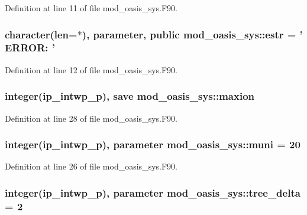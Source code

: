 Definition at line 11 of file mod\+\_\+oasis\+\_\+sys.\+F90.

\hypertarget{classmod__oasis__sys_a0f6e0376585c6f39d653f5ab05e80e8f}{
\subsubsection[{estr}]{\setlength{\rightskip}{0pt plus 5cm}character(len=$\ast$), parameter, public mod\+\_\+oasis\+\_\+sys\+::estr = ' E\+R\+R\+O\+R\+: '}}\label{classmod__oasis__sys_a0f6e0376585c6f39d653f5ab05e80e8f}


Definition at line 12 of file mod\+\_\+oasis\+\_\+sys.\+F90.

\hypertarget{classmod__oasis__sys_a9dc0e2d10d9e8e8c23e391467ae2eee4}{
\subsubsection[{maxion}]{\setlength{\rightskip}{0pt plus 5cm}integer(ip\+\_\+intwp\+\_\+p), save mod\+\_\+oasis\+\_\+sys\+::maxion\hspace{0.3cm}{\ttfamily [private]}}}\label{classmod__oasis__sys_a9dc0e2d10d9e8e8c23e391467ae2eee4}


Definition at line 28 of file mod\+\_\+oasis\+\_\+sys.\+F90.

\hypertarget{classmod__oasis__sys_a7e34042b8f7e733f15516c7d544338a2}{
\subsubsection[{muni}]{\setlength{\rightskip}{0pt plus 5cm}integer(ip\+\_\+intwp\+\_\+p), parameter mod\+\_\+oasis\+\_\+sys\+::muni = 20\hspace{0.3cm}{\ttfamily [private]}}}\label{classmod__oasis__sys_a7e34042b8f7e733f15516c7d544338a2}


Definition at line 26 of file mod\+\_\+oasis\+\_\+sys.\+F90.

\hypertarget{classmod__oasis__sys_ad7e3af62b75730bc71be0df8ae50cf0a}{
\subsubsection[{tree\+\_\+delta}]{\setlength{\rightskip}{0pt plus 5cm}integer(ip\+\_\+intwp\+\_\+p), parameter mod\+\_\+oasis\+\_\+sys\+::tree\+\_\+delta = 2\hspace{0.3cm}{\ttfamily [private]}}}\label{classmod__oasis__sys_ad7e3af62b75730bc71be0df8ae50cf0a}


